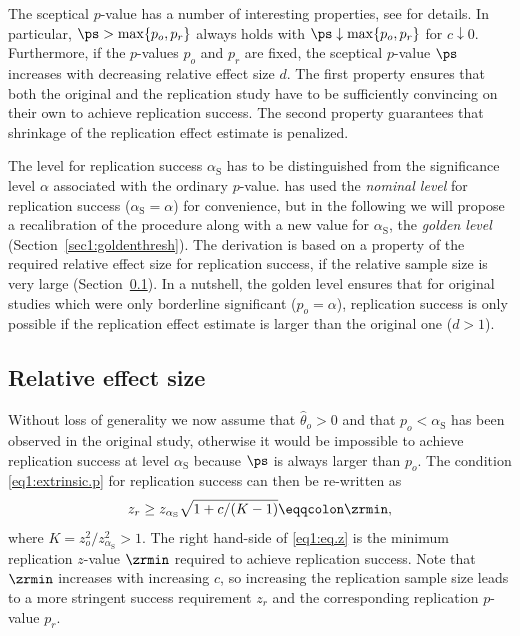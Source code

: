 The sceptical $p$-value has a number of interesting properties, see
\citet[Section 3.1]{Held2020} for details. In particular,
$\ps > \max\{p_o, p_r\}$ always holds with $\ps \downarrow \max\{p_o, p_r\}$ for
$c \downarrow 0$. Furthermore, if the $p$-values $p_o$ and $p_r$ are fixed, the
sceptical $p$-value $\ps$ increases with decreasing relative effect size $d$.
The first property ensures that both the original and the replication study have
to be sufficiently convincing on their own to achieve replication success. The
second property guarantees that shrinkage of the replication effect estimate is
penalized.

The level for replication success $\alpha_{\mathrm{S}}$ has to be distinguished
from the significance level $\alpha$ associated with the ordinary $p$-value.
\citet{Held2020} has used the \textit{nominal level} for replication success
($\alpha_{\mathrm{S}}=\alpha$) for convenience, but in the following we will
propose a recalibration of the procedure along with a new value for
$\alpha_{\mathrm{S}}$, the \textit{golden level}
(Section~\ref{sec1:goldenthresh}). The derivation is based on a property of the
required relative effect size for replication success, if the relative sample
size is very large (Section~\ref{sec1:res}). In a nutshell, the golden level
ensures that for original studies which were only borderline significant
($p_o=\alpha$), replication success is only possible if the replication
effect estimate is larger than the original one ($d > 1$).\\


\subsection{Relative effect size}\label{sec1:res}
Without loss of generality we now assume that $\hat \theta_o > 0$ and that
$p_o < {\alpha_{\mathrm{S}}}$ has been observed in the original study, otherwise
it would be impossible to achieve replication success at level
$\alpha_{\mathrm{S}}$ because $\ps$ is always larger than $p_o$. The condition
\eqref{eq1:extrinsic.p} for replication success can then be re-written as
\begin{equation}\label{eq1:eq.z}
  z_r \geq   z_{{\alpha_{\mathrm{S}}}} \sqrt{1+c/(K-1)} \eqqcolon  \zrmin,
\end{equation}
where $K=z_o^2/z_{{\alpha_{\mathrm{S}}}}^2>1$. The right hand-side of
\eqref{eq1:eq.z} is the minimum replication $z$-value $\zrmin$ required to
achieve replication success. Note that $\zrmin$ increases with increasing $c$,
so increasing the replication sample size leads to a more stringent success
requirement $z_r$ and the corresponding replication $p$-value $p_r$.

